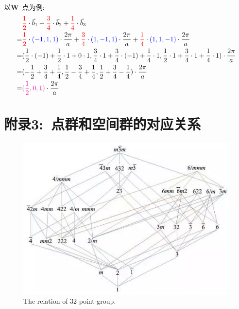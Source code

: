 \documentclass{article}      %
\begin{document}
以\textbf{W}~点为例:
\begin{displaymath}
	\begin{aligned}
		&\textcolor{red}{\frac12}\cdot\vec b_1+\textcolor{red}{\frac34}\cdot\vec b_2+\textcolor{red}{\frac14}\cdot\vec b_3\\
		=&\textcolor{red}{\frac12}\cdot\textcolor{blue}{(-1, 1, 1)}\cdot\frac{2\pi}a+\textcolor{red}{\frac34}\cdot\textcolor{blue}{(1, -1, 1)}\cdot\frac{2\pi}a+\textcolor{red}{\frac14}\cdot\textcolor{blue}{(1, 1, -1)}\cdot\frac{2\pi}a\\
		=&(\frac12\cdot(-1)+\frac12\cdot1+0\cdot1,\frac34\cdot1+\frac34\cdot(-1)+\frac14\cdot1,\frac12\cdot1+\frac34\cdot1+\frac14\cdot1)\cdot\frac{2\pi}a\\
		=&(-\frac12+\frac34+\frac14,\frac12-\frac34+\frac14,\frac12+\frac34-\frac14)\cdot\frac{2\pi}a\\
		=&\textcolor{magenta}{(\frac12,0,1)}\cdot\frac{2\pi}a
	\end{aligned}
\end{displaymath}

\section{附录3:~点群和空间群的对应关系}
\begin{figure}[h!]
\centering
\includegraphics{Point_Group.jpg}
\caption{\small The relation of 32 point-group.}%
\label{Fig:Point_Group}
\end{figure}
\end{document}
